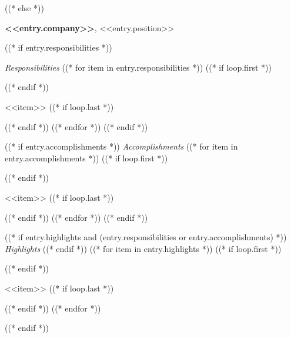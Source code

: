 ((* else *))
\begin{onecolentry}
\textbf{<<entry.company>>}, <<entry.position>>

((* if entry.responsibilities *))
    
    \textit{\newline Responsibilities}
    ((* for item in entry.responsibilities *))
        ((* if loop.first *))
    \begin{highlights}
        ((* endif *))
        \item <<item>>
        ((* if loop.last *))
    \end{highlights}   
        ((* endif *))
    ((* endfor *))
((* endif *))

((* if entry.accomplishments *))
    \textit{Accomplishments}
    ((* for item in entry.accomplishments *))
        ((* if loop.first *))
    \begin{highlights}
        ((* endif *))
        \item <<item>>
        ((* if loop.last *))
    \end{highlights}
        ((* endif *))
    ((* endfor *))
((* endif *))

((* if entry.highlights and (entry.responsibilities or entry.accomplishments) *))
\textit{Highlights}
((* endif *))
((* for item in entry.highlights *))
    ((* if loop.first *))
\begin{highlights}
    ((* endif *))
    \item <<item>>
    ((* if loop.last *))
\end{highlights}
    ((* endif *))
((* endfor *))
\end{onecolentry}

((* endif *))